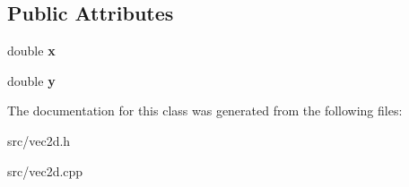 \subsection*{Public Attributes}
\begin{DoxyCompactItemize}
\item 
\hypertarget{classvec2d_a9a5047bd83eb9df966feaa0d4fc9bd80}{
double {\bfseries x}}
\label{classvec2d_a9a5047bd83eb9df966feaa0d4fc9bd80}

\item 
\hypertarget{classvec2d_a6e4cfba9ce4bece3c6a9fb215dbff935}{
double {\bfseries y}}
\label{classvec2d_a6e4cfba9ce4bece3c6a9fb215dbff935}

\end{DoxyCompactItemize}


The documentation for this class was generated from the following files:\begin{DoxyCompactItemize}
\item 
src/vec2d.h\item 
src/vec2d.cpp\end{DoxyCompactItemize}
